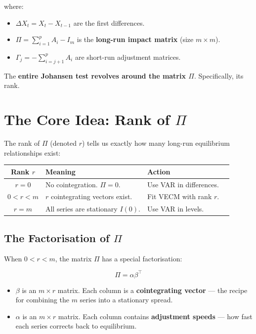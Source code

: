 \documentclass[12pt, a4paper]{article}
\begin{document}
where:
\begin{itemize}
    \item $\Delta X_t = X_t - X_{t-1}$ are the first differences.
    \item $\Pi = \sum_{i=1}^{p} A_i - I_m$ is the \textbf{long-run impact matrix} (size $m \times m$).
    \item $\Gamma_j = -\sum_{i=j+1}^{p} A_i$ are short-run adjustment matrices.
\end{itemize}

The \textbf{entire Johansen test revolves around the matrix $\Pi$}. Specifically, its rank.

\section{The Core Idea: Rank of $\Pi$}

The rank of $\Pi$ (denoted $r$) tells us exactly how many long-run equilibrium relationships exist:

\begin{center}
\begin{tabular}{@{}clll@{}}
\toprule
\textbf{Rank $r$} & \textbf{Meaning} & \textbf{Action} \\
\midrule
$r = 0$      & No cointegration. $\Pi = 0$. & Use VAR in differences. \\
$0 < r < m$  & $r$ cointegrating vectors exist. & Fit VECM with rank $r$. \\
$r = m$      & All series are stationary $I(0)$. & Use VAR in levels. \\
\bottomrule
\end{tabular}
\end{center}

\subsection{The Factorisation of $\Pi$}

When $0 < r < m$, the matrix $\Pi$ has a special factorisation:

\begin{equation}
    \boxed{ \Pi = \alpha \beta^\top }
    \label{eq:factor}
\end{equation}

\begin{itemize}
    \item $\beta$ is an $m \times r$ matrix. Each column is a \textbf{cointegrating vector} — the recipe 
          for combining the $m$ series into a stationary spread.
    \item $\alpha$ is an $m \times r$ matrix. Each column contains \textbf{adjustment speeds} — 
          how fast each series corrects back to equilibrium.
\end{itemize}
\end{document}
